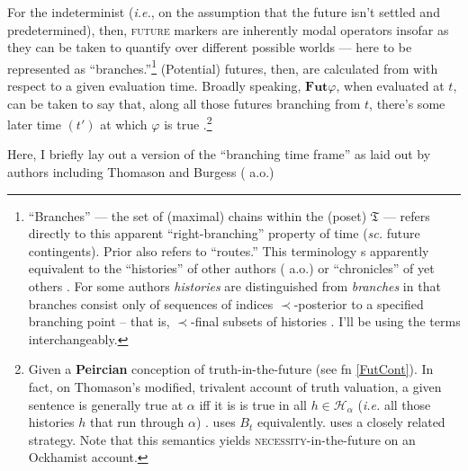 \documentclass[11pt,dvipsnames]{report}
\begin{document}
For the indeterminist (\textit{i.e.}, on the assumption that the future isn't settled and predetermined), then, \textsc{future} markers are inherently modal operators insofar as they can be taken to quantify over different possible worlds --- here to be represented as ``branches.''\footnote{``Branches'' --- the set of (maximal) chains within the (poset) $\mathfrak T$ --- refers directly to this apparent ``right-branching'' property of time (\textit{sc.} future contingents). Prior also refers to ``routes.'' This terminology s apparently equivalent to the ``histories'' of other authors (\citealp{Thomason1970,Dowty1977,Tedeschi1981,Belnap2001a} a.o.) or ``chronicles'' of yet others \citep{Øhrstrøm1995}. For some authors \textit{histories} are distinguished from \textit{branches} in that branches consist only of sequences of indices $ \prec $-posterior to a specified branching point -- that is, $ \prec $-final subsets of histories \citep[\textit{e.g.},][4]{Zanardo1996}. I'll be using the terms interchangeably.} (Potential) futures, then, are calculated from with respect to a given evaluation time. Broadly speaking, $ \mathbf{Fut} \varphi $, when evaluated at $ t $, can be taken to say that, along all those futures branching from $ t $, there's some later time $ (t') $ at which $ \varphi $ is true \citep[see][267]{Thomason1970}.\footnote{Given a \textbf{Peircian} conception of truth-in-the-future (see fn \ref{FutCont}). In fact, on Thomason's modified, trivalent account of truth valuation, a given sentence is generally true at $ \alpha $ iff it is is true in all $ h\in\mathcal H_\alpha $ (\textit{i.e.} all those histories $ h $ that run through $ \alpha $) \citeyearpar[274\textit{ff}]{Thomason1970}. \citet{Thomason1984} uses $\mathit B_t $ equivalently. \citet[247]{Tedeschi1981} uses a closely related strategy. Note that this semantics yields \textsc{necessity}-in-the-future on an Ockhamist account.} 

Here, I briefly lay out a version of the ``branching time frame'' as laid out by authors including Thomason \citeyearpar[\textit{e.g.},][\S 5]{Thomason1984} and Burgess (\citeyear[\textit{e.g.},][]{Burgess1978} a.o.) 


\end{document}
